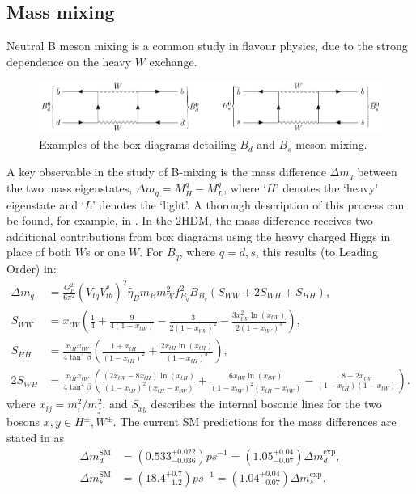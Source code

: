 \documentclass[a4paper,12pt]{article}
\begin{document}
\subsection{Mass mixing}
\label{subsec:mix}
Neutral B meson mixing is a common study in flavour physics, due to the strong dependence on the heavy $W$ exchange. 
\begin{figure}[ht]
    \centering
    \includegraphics[scale=0.95,trim=12em 44.5em 8em 12em,clip]{bmix.pdf}
    \caption{\label{fig:bmix} Examples of the box diagrams detailing $B_d$ and $B_s$ meson mixing.}
\end{figure}
A key observable in the study of B-mixing is the mass difference $\Delta m_q$ between the two mass eigenstates, $\Delta m_q = M_H^q - M_L^q$, where `$H$' denotes the `heavy' eigenstate and `$L$' denotes the `light'. 
A thorough description of this process can be found, for example, in \cite{mix15}.
In the 2HDM, the mass difference receives two additional contributions from box diagrams using the heavy charged Higgs in place of both $W$s or one $W$. 
For $B_q$, where $q=d,s$, this results (to Leading Order) in:
\begin{align}
    \Delta m_q &= \frac{G_F^2}{6\pi^2}(V_{tq}V_{tb}^*)^2\hat{\eta}_Bm_Bm_W^2f_{B_q}^2B_{B_q}(S_{WW}+2S_{WH}+S_{HH}), \\
    S_{WW} &= x_{tW}\left(\frac14+\frac{9}{4(1-x_{tW})}-\frac{3}{2(1-x_{tW})^2}-\frac{3x_{tW}^2\ln(x_{tW})}{2(1-x_{tW})^3}\right), \\
    S_{HH} &= \frac{x_{tH}x_{tW}}{4\tan^4\beta}\left(\frac{1+x_{tH}}{(1-x_{tH})^2}+\frac{2x_{tH}\ln(x_{tH})}{(1-x_{tH})^3}\right),\\
    2S_{WH} &= \frac{x_{tH}x_{tW}}{4\tan^2\beta}\left(\frac{(2x_{tW}-8x_{tH})\ln(x_{tH})}{(1-x_{tH})^2(x_{tH}-x_{tW})}+\frac{6x_{tW}\ln(x_{tW})}{(1-x_{tW})^2(x_{tH}-x_{tW})}-\frac{8-2x_{tW}}{(1-x_{tH})(1-x_{tW})}\right).
\end{align}
where $x_{ij} = m_i^2/m_j^2$, and $S_{xy}$ describes the internal bosonic lines for the two bosons $x,y \in H^\pm,W^\pm$.
The current SM predictions for the mass differences are stated in \cite{bmix} as
\begin{align}
    \Delta m^{\text{SM}}_d &= \left(0.533^{+0.022}_{-0.036}\right)ps^{-1} = \left(1.05^{+0.04}_{-0.07}\right)\Delta m_d^{\text{exp}}, \\
    \Delta m^{\text{SM}}_s &= \left(18.4^{+0.7}_{-1.2}\right)ps^{-1} = \left(1.04^{+0.04}_{-0.07}\right)\Delta m_s^{\text{exp}}.
\end{align}
\end{document}

